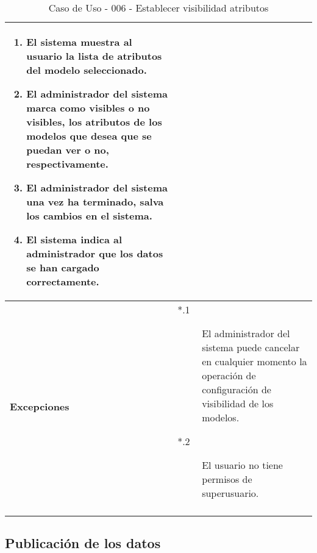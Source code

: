 \begin{center}
\begin{longtable}{||p{3.4cm}|p{12cm}||}
\begin{enumerate}
                \item El sistema muestra al usuario la lista de atributos del
                       modelo seleccionado.
                \item El administrador del sistema marca como visibles o no
                       visibles, los atributos de los modelos que desea que se
                       puedan ver o no, respectivamente.
                \item El administrador del sistema una vez ha terminado, salva
                       los cambios en el sistema.
                \item El sistema indica al administrador que los datos se han
                       cargado correctamente.
             \end{enumerate}\\
 \hline \bf Excepciones &
             \begin{description}
                \item[*.1] El administrador del sistema puede cancelar en
                          cualquier momento la operación de configuración de
                          visibilidad de los modelos.
                \item[*.2] El usuario no tiene permisos de superusuario.
             \end{description}\\
\hline
\hline
\caption{\label{tab:caso006} Caso de Uso - 006 - Establecer visibilidad \mbox{atributos}} 
\end{longtable}
\end{center}


\subsection{Publicación de los datos}

